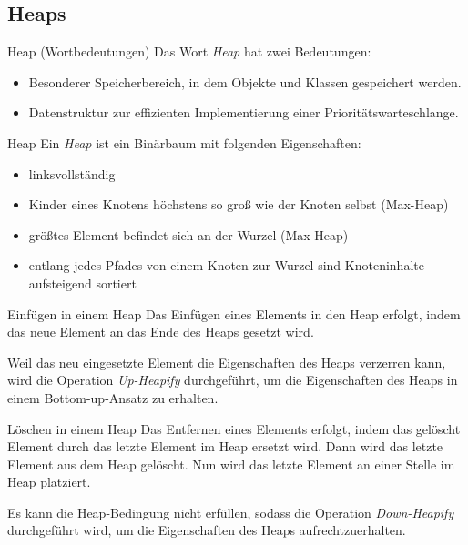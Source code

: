 \documentclass[german]{../spicker}
\begin{document}
\subsection{Heaps}

\begin{bonus}{Heap (Wortbedeutungen)}
    Das Wort \emph{Heap} hat zwei Bedeutungen:
    \begin{itemize}
        \item Besonderer Speicherbereich, in dem Objekte und Klassen gespeichert werden.
        \item Datenstruktur zur effizienten Implementierung einer Prioritätswarteschlange.
    \end{itemize}
\end{bonus}

\begin{defi}{Heap}
    Ein \emph{Heap} ist ein Binärbaum mit folgenden Eigenschaften:
    \begin{itemize}
        \item linksvollständig
        \item Kinder eines Knotens höchstens so groß wie der Knoten selbst (Max-Heap)
        \item größtes Element befindet sich an der Wurzel (Max-Heap)
        \item entlang jedes Pfades von einem Knoten zur Wurzel sind Knoteninhalte aufsteigend sortiert
    \end{itemize}
\end{defi}

\begin{algo}{Einfügen in einem Heap}
    Das Einfügen eines Elements in den Heap erfolgt, indem das neue Element an das Ende des Heaps gesetzt wird.

    Weil das neu eingesetzte Element  die Eigenschaften des Heaps verzerren kann, wird die Operation \emph{Up-Heapify} durchgeführt, um die Eigenschaften des Heaps in einem Bottom-up-Ansatz zu erhalten.
\end{algo}

\begin{algo}{Löschen in einem Heap}
    Das Entfernen eines Elements erfolgt, indem das gelöscht Element durch das letzte Element im Heap ersetzt wird. Dann wird das letzte Element aus dem Heap gelöscht. Nun wird das letzte Element an einer Stelle im Heap platziert.

    Es kann die Heap-Bedingung nicht erfüllen, sodass die Operation \emph{Down-Heapify} durchgeführt wird, um die Eigenschaften des Heaps aufrechtzuerhalten.
\end{algo}
\end{document}
